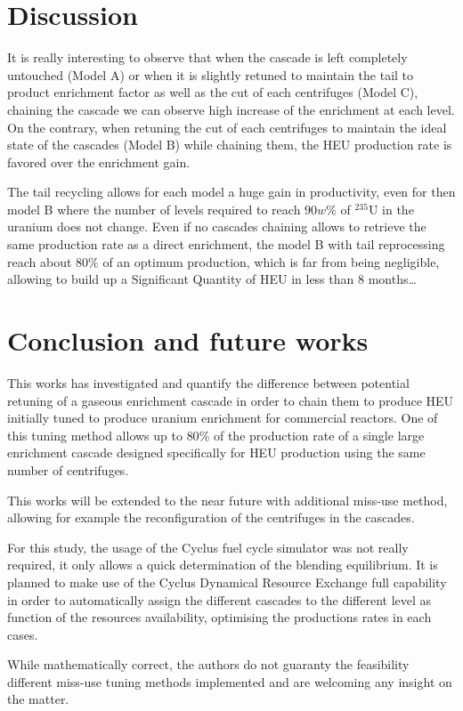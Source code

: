 \section{Discussion}

It is really interesting to observe that when the cascade is left completely
untouched (Model A) or when it is slightly retuned to maintain the tail to
product enrichment factor as well as the cut of each centrifuges (Model C),
chaining the cascade we can observe high increase of the enrichment at each
level.  On the contrary, when retuning the cut of each centrifuges to maintain
the ideal state of the cascades (Model B) while chaining them, the \gls{HEU}
production rate is favored over the enrichment gain.

The tail recycling allows for each model a huge gain in productivity, even for
then model B where the number of levels required to reach $90w\%$ of $^{235}$U
in the uranium does not change. Even if no cascades chaining allows to retrieve
the same production rate as a direct enrichment, the model B with tail
reprocessing reach about $80\%$ of an optimum production, which is far from
being negligible, allowing to build up a Significant Quantity of \gls{HEU} in
less than 8 months\ldots


\section{Conclusion and future works}

This works has investigated and quantify the difference between potential
retuning of a gaseous enrichment cascade in order to chain them to produce
\gls{HEU} initially tuned to produce uranium enrichment for commercial reactors.
One of this tuning method allows up to $80\%$ of the production rate of a single
large enrichment cascade designed specifically for \gls{HEU} production using
the same number of centrifuges.

This works will be extended to the near future with additional miss-use method,
allowing for example the reconfiguration of the centrifuges in the cascades.

For this study, the usage of the Cyclus fuel cycle simulator was not really
required, it only allows a quick determination of the blending equilibrium. It
is planned to make use of the Cyclus Dynamical Resource Exchange full capability
in order to automatically assign the different cascades to the different level
as function of the resources availability, optimising the productions rates in
each cases.

While mathematically correct, the authors do not guaranty the feasibility
different miss-use tuning methods implemented and are welcoming any insight on
the matter.


